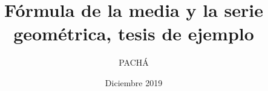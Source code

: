 \documentclass[12pt,reqno,oneside,pdftex]{formato-puc/puctesis} %
\begin{document}


\title{Fórmula de la media y la serie geométrica, tesis de ejemplo}
\author{PACHÁ}

\address{Facultad de Matemáticas\\
         Pontificia Universidad Cat\'olica de Chile\\ 
         Vicu\~na Mackenna 4860\\
         Santiago, Chile\\
         {\it Tel.\/} : 56 (2) 354-2000}
\subject      {Estimación de parámetros}
\date         {Diciembre 2019}
\dedication   {A mi familia, amigos y personas valiosas de la
universidad}

\newlength{\cslhangindent}
\setlength{\cslhangindent}{1.5em}
\newenvironment{CSLReferences}%
  {}%
  {\par}


\PageNumbersFootCentered       %
\maketitle


\end{document}
